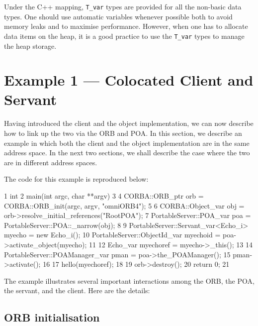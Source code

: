 \documentclass[11pt,oneside,a4paper]{book}
\newcommand{\type}[1]{\texttt{#1}}
\begin{document}
Under the C++ mapping, \type{T\_var} types are provided for all the
non-basic data types.  One should use automatic variables whenever
possible both to avoid memory leaks and to maximise performance.
However, when one has to allocate data items on the heap, it is a good
practice to use the \type{T\_var} types to manage the heap storage.

\section{Example 1 --- Colocated Client and Servant}
\label{objeg1}

Having introduced the client and the object implementation, we can now
describe how to link up the two via the ORB and POA. In this section,
we describe an example in which both the client and the object
implementation are in the same address space. In the next two
sections, we shall describe the case where the two are in different
address spaces.

The code for this example is reproduced below:

\lstset{numbers=left,gobble=4}
\begin{cxxlisting}
 1  int
 2  main(int argc, char **argv)
 3  {
 4    CORBA::ORB_ptr orb = CORBA::ORB_init(argc, argv, "omniORB4");
 5
 6    CORBA::Object_var       obj = orb->resolve_initial_references("RootPOA");
 7    PortableServer::POA_var poa = PortableServer::POA::_narrow(obj);
 8
 9    PortableServer::Servant_var<Echo_i> myecho = new Echo_i();
10    PortableServer::ObjectId_var myechoid = poa->activate_object(myecho);
11
12    Echo_var myechoref = myecho->_this();
13
14    PortableServer::POAManager_var pman = poa->the_POAManager();
15    pman->activate();
16
17    hello(myechoref);
18
19    orb->destroy();
20    return 0;
21  }
\end{cxxlisting}
\lstset{numbers=none,gobble=0}

The example illustrates several important interactions among the ORB,
the POA, the servant, and the client. Here are the details:

\subsection{ORB initialisation}
\end{document}
